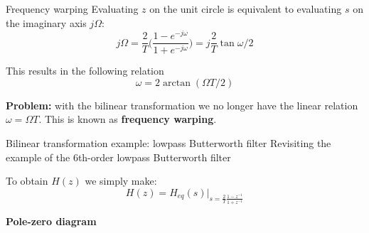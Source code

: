 \documentclass[10pt, aspectratio=169]{beamer}
\begin{document}
\begin{frame}{Frequency warping}
	Evaluating $z$ on the unit circle is equivalent to evaluating $s$ on the imaginary axis $j\Omega$:
	\begin{equation*}
j\Omega = \frac{2}{T}\bigg(\frac{1 - e^{-j\omega}}{1 + e^{-j\omega}}\bigg) = j\frac{2}{T}\tan\omega/2
\end{equation*}

This results in the following relation
\begin{equation*}
	\omega =2\arctan(\Omega T/2) \tag{frequency warping}
\end{equation*}

\textbf{Problem:} with the bilinear transformation we no longer have the linear relation $\omega = \Omega T$. This is known as \textbf{frequency warping}.

\begin{center}
	\resizebox{0.4\linewidth}{!}{}
\end{center}
\end{frame}

%
\begin{frame}{Bilinear transformation example: lowpass Butterworth filter}
Revisiting the example of the 6th-order lowpass Butterworth filter

To obtain $H(z)$ we simply make:
\begin{equation*}
H(z) = H_{eq}(s)\bigg|_{\displaystyle s = \frac{2}{T}\frac{1 - z^{-1}}{1 + z^{-1}}}
\end{equation*}

\textbf{Pole-zero diagram}
\begin{center}
	\resizebox{0.4\linewidth}{!}{}
\end{center}

\end{frame}
\end{document}
